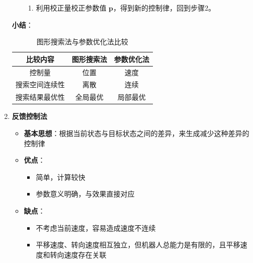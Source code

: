 \documentclass[../main.tex]{subfiles}
\begin{document}
\begin{enumerate}
\begin{itemize}
{\begin{enumerate}
                        \item 利用校正量校正参数值 $\mathbf{p}$，得到新的控制律，回到步骤2。
                        
                    \end{enumerate}}

                        \end{itemize}
                    \textbf{小结}：
                    \begin{table}[H]
                        \centering
                        \caption{图形搜索法与参数优化法比较}
                        \begin{tabular}{ccc}
                        \toprule
                        \textbf{比较内容} & \textbf{图形搜索法} & \textbf{参数优化法} \\
                        \midrule
                        控制量 & 位置 & 速度 \\
                        搜索空间连续性 & 离散 & 连续 \\
                        搜索结果最优性 & 全局最优 & 局部最优 \\
                        \bottomrule
                        \end{tabular}
                    \end{table}
                    \item \textbf{反馈控制法}\label{method:feedback}
                        \begin{itemize}
                            \item \textbf{基本思想}：根据当前状态与目标状态之间的差异，来生成减少这种差异的控制律
                            \item \textbf{优点}：
                                \begin{itemize}
                                    \item 简单，计算较快
                                    \item 参数意义明确，与效果直接对应
                                \end{itemize}
                            \item \textbf{缺点}：
                                \begin{itemize}
                                    \item 不考虑当前速度，容易造成速度不连续
                                    \item 平移速度、转向速度相互独立，但机器人总能力是有限的，且平移速度和转向速度存在关联

\end{itemize}
\end{itemize}
\end{enumerate}
\end{document}
